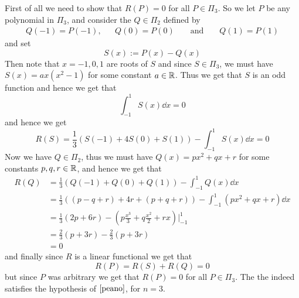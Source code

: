 First of all we need to show that $R(P) = 0$ for all $P \in \Pi_3$. So we let $P$ be any polynomial in $\Pi_3$, and consider the  $Q \in \Pi_2$ defined by
\begin{align*}
    Q(-1) = P(-1), && Q(0) = P(0) &&\mbox{ and } &&Q(1) = P(1)
\end{align*} 
and set
\[
    S(x) := P(x) - Q(x)    
\] 
Then note that $x = -1, 0, 1$ are roots of $S$ and since $S \in \Pi_3$, we must have $S(x) = ax(x^2-1)$ for some constant $a \in \mathbb{R}$. Thus we get that $S$ is an odd function and hence we get that 
\[
    \int_{-1}^1 S(x) \dd{x} = 0  
\]
and hence we get 
\[
    R(S) = \frac{1}{3} (S(-1) + 4S(0) + S(1)) - \int_{-1}^1 S(x) \dd{x} = 0  
\]
Now we have $Q \in \Pi_2$, thus we must have $Q(x) = px^2 + qx + r$ for some constants $p,q,r \in \mathbb{R}$, and hence we get that 
\begin{align*}
    R(Q) 
    &= \frac{1}{3}(Q(-1) + Q(0) + Q(1)) - \int_{-1}^1 Q(x) \dd{x} \\
    &= \frac{1}{3}((p-q+r)+4r+(p+q+r)) - \int_{-1}^1 (px^2+qx+r)\dd{x}  \\ 
    &= \frac{1}{3}(2p+6r) - \left( p\frac{x^3}{3} + q \frac{x^2}{2} + rx \right) \Bigg\vert_{-1}^1 \\ 
    &= \frac{2}{3}(p+3r) - \frac{2}{3}(p+3r) \\ 
    &= 0
\end{align*} 
and finally since $R$ is a linear functional we get that 
\[
    R(P) = R(S) + R(Q) = 0  
\]
but since $P$ was arbitrary we get that $R(P) = 0$ for all $P \in \Pi_3$. The the  indeed satisfies the hypothesis of  $\ref{peano}$, for $n = 3$.   